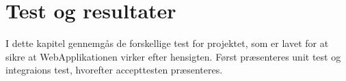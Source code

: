 \chapter{Test og resultater}
I dette kapitel gennemgås de forskellige test for projektet, som er lavet for at sikre at WebApplikationen virker efter hensigten. Først præsenteres unit test og integraions test, hvorefter accepttesten præsenteres.






